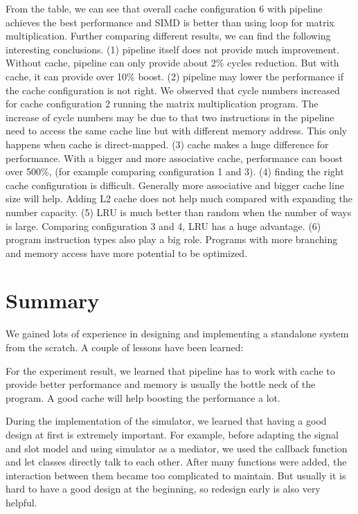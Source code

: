 \documentclass{sig-alternate}
\begin{document}
From the table, we can see that overall cache configuration 6 with pipeline achieves the best performance and SIMD is better than using loop for matrix multiplication. Further comparing different results, we can find the following interesting conclusions. (1) pipeline itself does not provide much improvement. Without cache, pipeline can only provide about 2\% cycles reduction. But with cache, it can provide over 10\% boost. (2) pipeline may lower the performance if the cache configuration is not right. We observed that cycle numbers increased for cache configuration 2  running the matrix multiplication program. The increase of cycle numbers may be due to that two instructions in the pipeline need to access the same cache line but with different memory address. This only happens when cache is direct-mapped. (3) cache makes a huge difference for performance. With a bigger and more associative cache, performance can boost over 500\%, (for example comparing configuration 1 and 3). (4) finding the right cache configuration is difficult. Generally more associative and bigger cache line size will help. Adding L2 cache does not help much compared with expanding the number capacity. (5) LRU is much better than random when the number of ways is large. Comparing configuration 3 and 4, LRU has a huge advantage. (6) program instruction types also play a big role. Programs with more branching and memory access have more potential to be optimized. 

\section{Summary}
We gained lots of experience in designing and implementing a standalone system from the scratch. A couple of lessons have been learned:

For the experiment result, we learned that pipeline has to work with cache to provide better performance and memory is usually the bottle neck of the program. A good cache will help boosting the performance a lot. 

During the implementation of the simulator, we learned that having a good design at first is extremely important. For example, before adapting the signal and slot model and using simulator as a mediator, we used the callback function and let classes directly talk to each other. After many functions were added, the interaction between them became too complicated to maintain. But usually it is hard to have a good design at the beginning, so redesign early is also very helpful. 
\end{document}
